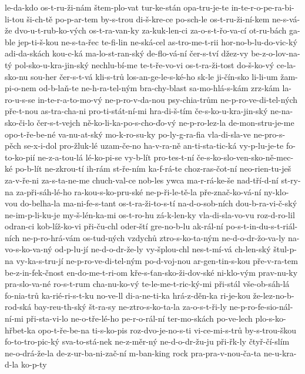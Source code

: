 le-da-kdo
os-t-ru-ži-nám
štem-plo-vat
tur-ke-stán
opa-tru-je-te
in-te-r-o-pe-ra-bi-li-tou
ši-ch-tě
po-p-ar-tem
by-s-trou
di-š-kre-ce
po-sch-le
os-t-ru-ži-ní-kem
ne-s-vá-že
dvo-u-t-rub-ko-vých
os-t-ra-van-ky
za-kuk-len-ci
za-o-s-t-řo-va-cí
ot-ru-bách
ga-ble
jep-ti-š-kou
ne-s-ta-řec
te-fi-lin
ne-ská-cel
as-tro-me-t-rii
hor-no-b-lu-do-vic-ký
adi-da-skách
kou-c-ká
ma-lo-st-ran-ský
de-flo-vá-ní
čer-s-tví
džez-vy
be-z-o-lov-na-tý
pol-sko-u-kra-jin-ský
nechlu-bí-me
te-t-ře-vo-vi
os-t-ra-ži-tost
do-š-ko-vý
ce-la-sko-nu
sou-her
čer-s-t-vá
kli-s-trů
los-an-ge-le-s-ké-ho
sk-le
ji-čín-sko
li-li-um
žam-pi-o-nem
od-b-laň-te
ne-h-ra-tel-ným
bra-chy-blast
sa-mo-hlá-s-kám
zrz-kám
la-ro-u-s-se
in-te-r-a-to-mo-vý
ne-p-ro-v-da-nou
psy-chia-trům
ne-p-ro-ve-di-tel-ných
pře-t-nou
as-tra-cha-ni
pro-ti-stát-ní-mi
hra-di-š-tím
če-s-ko-u-kra-jin-ský
ne-na-sko-či-lo
čer-s-t-vejch
ně-ko-li-ka-po-s-cho-ďo-vý
ne-p-ro-lez-la
de-mon-stru-je-me
opo-t-ře-be-né
va-nu-at-ský
mo-k-ro-su-ky
po-ly-g-ra-fia
vla-di-sla-ve
ne-pro-s-pěch
se-x-i-dol
pro-žluk-lé
uzam-če-no
ha-v-ra-ně
an-ti-sta-tic-ká
vy-p-lu-je-te
fo-to-ko-pií
ne-z-a-tou-lá
lé-ko-pi-se
vy-b-lít
pro-tes-t-ní
če-s-ko-slo-ven-sko-ně-mec-ké
po-b-lít
ne-zkrou-tí
ih-rám
st-ře-ním
ka-f-rá-te
choz-ras-čot-ní
neo-rien-tu-ješ
za-v-ře-ni
za-s-ta-ne-me
chuch-val-ce
nob-les
ywca
ma-r-rá-ke-še
nad-tří-d-ní
st-ry-na
za-při-sáh-lé-ho
ra-kou-s-ko-pru-ské
ne-p-ři-le-tě-la
pře-znač-ko-vá-ní
ny-klo-vou
do-belha-la
ma-ni-fe-s-tant
os-t-ra-ži-to-s-tí
na-d-o-sob-ních
dou-b-ra-vi-č-ský
ne-im-p-li-ku-je
my-š-lén-ka-mi
os-t-ro-hu
zá-k-len-ky
vla-di-sla-vo-vu
roz-d-ro-lil
odran-ci
kob-líž-ko-vi
při-ču-chl
oder-ští
gre-no-b-lu
ak-rál-ní
po-s-t-in-du-s-t-riál-ních
ne-p-ro-hrá-vám
os-tud-ných
vzdychů
ztro-s-ko-ta-ným
ne-d-o-dr-žo-va-ly
na-vo-s-ko-va-ný
od-p-lu-jí
ne-d-o-dr-že-ly
vy-šplou-chl
nes-t-mí-vá
ch-len-ský
štul-p-na
vy-ka-s-tru-jí
ne-p-ro-ve-di-tel-ným
po-d-voj-nou
ar-gen-tin-s-kou
pře-v-ra-tem
be-z-in-fek-čnost
en-do-me-t-ri-om
kře-s-ťan-sko-ži-dov-ské
ni-klo-vým
prav-nu-ky
pra-slo-va-né
ro-s-t-rum
cha-nu-ko-vý
te-le-me-t-ric-ký-mi
při-stál
vše-ob-sáh-lá
fo-nia-trů
ka-rié-ri-s-t-ku
no-ve-ll
di-a-ne-ti-ka
hrá-z-děn-ka
ri-je-kou
že-lez-no-b-rod-ská
bay-reu-th-ský
št-ra-sy
ne-ztro-s-ko-ta-la
za-o-s-t-ři-ly
ne-p-ro-fe-sio-nál-ní-mi
při-sta-vi-lo
ne-o-tře-lé-ho
pe-r-o-rál-ní
ter-mo-skách
po-ve-lech
plo-s-ko-hřbet-ka
opo-t-ře-be-na
ti-s-ko-pis
roz-dvo-je-no-s-ti
vi-ce-mi-s-trů
by-s-trou-škou
fo-to-tro-pic-ký
sva-to-stá-nek
ne-z-měr-ný
ne-d-o-dr-žu-ju
při-řk-ly
čtyř-čí-slím
ne-o-drá-že-la
de-z-ur-ba-ni-zač-ní
m-ban-king
rock
pra-pra-v-nou-ča-ta
ne-u-kra-d-la
ko-p-ty
